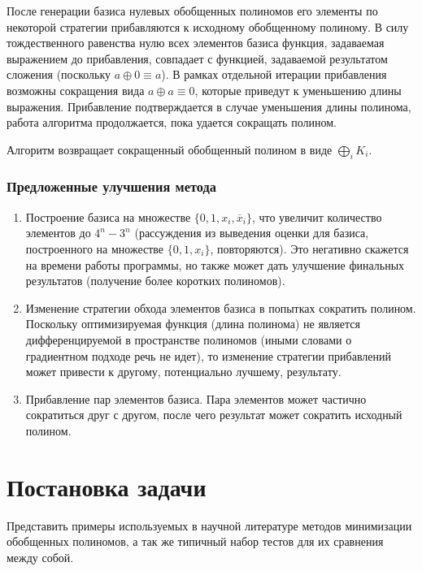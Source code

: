 \documentclass[a4paper,12pt,titlepage,finall]{article}
\begin{document}
После генерации базиса нулевых обобщенных полиномов его элементы по некоторой стратегии прибавляются к исходному обобщенному полиному. В силу тождественного равенства нулю всех элементов базиса функция, задаваемая выражением до прибавления, совпадает с функцией, задаваемой результатом сложения (поскольку $ a \oplus 0 \equiv a $). В рамках отдельной итерации прибавления возможны сокращения вида $ a \oplus a \equiv 0 $, которые приведут к уменьшению длины выражения. Прибавление подтверждается в случае уменьшения длины полинома, работа алгоритма продолжается, пока удается сокращать полином.

Алгоритм возвращает сокращенный обобщенный полином в виде $ \bigoplus\limits_i K_i $.

\subsubsection{Предложенные улучшения метода}

\begin{enumerate}
    \item Построение базиса на множестве $ \{ 0, 1, x_i, \overline x_i \} $, что увеличит количество элементов до $ 4^n - 3^n $ (рассуждения из выведения оценки для базиса, построенного на множестве $ \{ 0, 1, x_i \} $, повторяются). Это негативно скажется на времени работы программы, но также может дать улучшение финальных результатов (получение более коротких полиномов).
    \item Изменение стратегии обхода элементов базиса в попытках сократить полином. Поскольку оптимизируемая функция (длина полинома) не является дифференцируемой в пространстве полиномов (иными словами о градиентном подходе речь не идет), то изменение стратегии прибавлений может привести к другому, потенциально лучшему, результату.
    \item Прибавление пар элементов базиса. Пара элементов может частично сократиться друг с другом, после чего результат может сократить исходный полином.
\end{enumerate}

\newpage

\section{Постановка задачи}

Представить примеры используемых в научной литературе методов минимизации обобщенных полиномов, а так же типичный набор тестов для их сравнения между собой.
\end{document}
